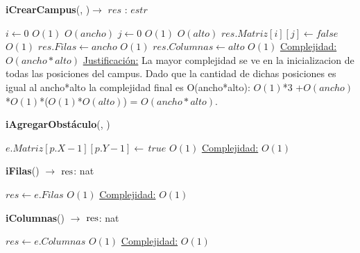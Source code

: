  \pagebreak

\begin{Algoritmos}

\begin{algorithm}[H]{\textbf{iCrearCampus}(, )$\to$ $res$ : $estr$}
	\begin{algorithmic}
            \State $i \gets 0$		\Comment $O(1)$
            	\Comment $O(ancho)$
            	\State $j \gets 0$	\Comment $O(1)$
                \Comment $O(alto)$
                	\State $res.Matriz[i][j] \gets false$ \Comment $O(1)$
                \EndWhile
            \EndWhile
            \State $res.Filas \gets ancho$	\Comment $O(1)$
            \State $res.Columnas \gets alto$	\Comment $O(1)$
	\Statex \underline{Complejidad:} $O(ancho * alto)$
	\Statex \underline{Justificación:} La mayor complejidad se ve en la inicializacion de todas las posiciones del campus. Dado que la cantidad de dichas posiciones es igual al ancho*alto la complejidad final es O(ancho*alto): $O(1)$*3 +$O(ancho)$*$O(1)$*($O(1)$*$O(alto)$) = $O(ancho*alto)$. 
	\end{algorithmic}
\end{algorithm}

\begin{algorithm}[H]{\textbf{iAgregarObst\'aculo}(, )}
	\begin{algorithmic}
       	\State $e.Matriz[p.X-1][p.Y-1] \gets \, true$ \Comment $O(1)$
	\Statex \underline{Complejidad:} $O(1)$
	\Statex
	\end{algorithmic}
\end{algorithm}

\begin{algorithm}[H]{\textbf{iFilas}() $\to$ $\res$: nat}
	\begin{algorithmic}
       	\State $res \gets e.Filas$ \Comment $O(1)$
	\Statex \underline{Complejidad:} $O(1)$
	\Statex
	\end{algorithmic}
\end{algorithm}

\begin{algorithm}[H]{\textbf{iColumnas}() $\to$ $\res$: nat}
	\begin{algorithmic}
       	\State $res \gets e.Columnas$ \Comment $O(1)$
	\Statex \underline{Complejidad:} $O(1)$
	\Statex
	\end{algorithmic}
\end{algorithm}


\end{Algoritmos}

